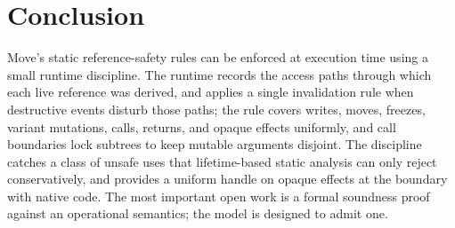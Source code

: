 \section{Conclusion}\label{sec:conclusion}

Move's static reference-safety rules can be enforced at execution
time using a small runtime discipline. The runtime records the
access paths through which each live reference was derived, and
applies a single invalidation rule when destructive events disturb
those paths; the rule covers writes, moves, freezes, variant
mutations, calls, returns, and opaque effects uniformly, and call
boundaries lock subtrees to keep mutable arguments disjoint. The
discipline catches a class of unsafe uses that lifetime-based static
analysis can only reject conservatively, and provides a uniform
handle on opaque effects at the boundary with native code. The most
important open work is a formal soundness proof against an
operational semantics; the model is designed to admit one.
